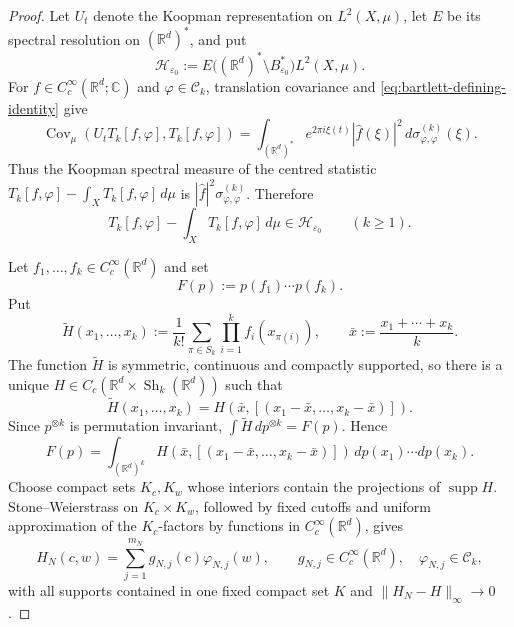 \documentclass[11pt,reqno,a4paper]{amsart}
\numberwithin{equation}{section}
\theoremstyle{compact}
\theoremstyle{definition}
\theoremstyle{definition}
\newcommand{\Sh}{\operatorname{Sh}}
\begin{document}
\begin{proof}
Let $U_t$ denote the Koopman representation on $L^2(X,\mu)$, let $E$ be its
spectral resolution on $(\mathbb R^d)^*$, and put
\[
  \mathcal H_{\varepsilon_0}
  :=E\bigl((\mathbb R^d)^*\setminus B_{\varepsilon_0}^*\bigr)L^2(X,\mu).
\]
For $f\in C_c^\infty(\mathbb R^d;\mathbb C)$ and
$\varphi\in\mathcal C_k$, translation covariance and
\eqref{eq:bartlett-defining-identity} give
\begin{equation}\label{eq:common-gap-koopman-spectrum}
  \operatorname{Cov}_\mu\!\left(
    U_tT_k[f,\varphi],T_k[f,\varphi]
  \right)
  =\int_{(\mathbb R^d)^*}e^{2\pi i\xi(t)}|\widehat f(\xi)|^2
    \,d\sigma^{(k)}_{\varphi,\varphi}(\xi).
\end{equation}
Thus the Koopman spectral measure of the centred statistic
$T_k[f,\varphi]-\int_XT_k[f,\varphi] \,d\mu$ is
$|\widehat f|^2\sigma^{(k)}_{\varphi,\varphi}$.  Therefore
\begin{equation}\label{eq:common-gap-pattern-subspace}
  T_k[f,\varphi]-\int_XT_k[f,\varphi] \,d\mu
  \in\mathcal H_{\varepsilon_0}
  \qquad(k\geq1).
\end{equation}

Let $f_1,\ldots,f_k\in C_c^\infty(\mathbb R^d)$ and set
\[
  F(p):=p(f_1)\cdots p(f_k).
\]
Put
\[
  \widetilde H(x_1,\ldots,x_k)
  :=\frac1{k!}\sum_{\pi\in S_k}\prod_{i=1}^k f_i(x_{\pi(i)}),
  \qquad
  \bar x:=\frac{x_1+\cdots+x_k}{k}.
\]
The function $\widetilde H$ is symmetric, continuous and compactly supported,
so there is a unique
$H\in C_c(\mathbb R^d\times\Sh_k(\mathbb R^d))$ such that
\[
  \widetilde H(x_1,\ldots,x_k)
  =H\!\left(\bar x,
    \left[(x_1-\bar x,\ldots,x_k-\bar x)\right]\right).
\]
Since $p^{\otimes k}$ is permutation invariant,
$\int\widetilde H\,dp^{\otimes k}=F(p)$.  Hence
\begin{equation}\label{eq:common-gap-polynomial-as-pattern}
  F(p)=\int_{(\mathbb R^d)^k}
  H\!\left(\bar x,
    \left[(x_1-\bar x,\ldots,x_k-\bar x)\right]\right)
  \,dp(x_1)\cdots dp(x_k).
\end{equation}
Choose compact sets $K_c,K_w$ whose interiors contain the projections of
$\operatorname{supp}H$.  Stone--Weierstrass on $K_c\times K_w$, followed by
fixed cutoffs and uniform approximation of the $K_c$-factors by functions in
$C_c^\infty(\mathbb R^d)$, gives
\[
  H_N(c,w)=\sum_{j=1}^{m_N}g_{N,j}(c)\varphi_{N,j}(w),
  \qquad
  g_{N,j}\in C_c^\infty(\mathbb R^d),\quad
  \varphi_{N,j}\in\mathcal C_k,
\]
with all supports contained in one fixed compact set $K$ and
$\|H_N-H\|_\infty\to0$.


\end{proof}
\end{document}

